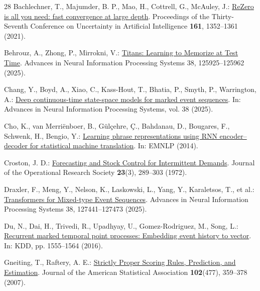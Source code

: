 \documentclass[runningheads]{llncs}
\begin{document}
\begin{thebibliography}{28}
Bachlechner, T., Majumder, B. P., Mao, H., Cottrell, G., McAuley, J.: \href{https://proceedings.mlr.press/v161/bachlechner21a.html}{ReZero is all you need: fast convergence at large depth}. Proceedings of the Thirty-Seventh Conference on Uncertainty in Artificial Intelligence \textbf{161}, 1352--1361 (2021).

Behrouz, A., Zhong, P., Mirrokni, V.: \href{https://papers.nips.cc/paper_files/paper/2025/hash/a4ca07aa108036f80cbb5b82285fd4b1-Abstract-Conference.html}{Titans: Learning to Memorize at Test Time}. Advances in Neural Information Processing Systems 38, 125925--125962 (2025). 

Chang, Y., Boyd, A., Xiao, C., Kass-Hout, T., Bhatia, P., Smyth, P., Warrington, A.:
\href{https://arxiv.org/abs/2412.19634}{Deep continuous-time state-space models for marked event sequences}. In: Advances in Neural Information Processing Systems, vol. 38 (2025).

Cho, K., van Merri\"enboer, B., G\"ul\c{c}ehre, \c{C}., Bahdanau, D., Bougares, F., Schwenk, H., Bengio, Y.:
\href{https://arxiv.org/abs/1406.1078}{Learning phrase representations using RNN encoder--decoder for statistical machine translation}. In: EMNLP (2014).

Croston, J. D.: \href{https://link.springer.com/article/10.1057/jors.1972.50}{Forecasting and Stock Control for Intermittent Demands}. Journal of the Operational Research Society \textbf{23}(3), 289--303 (1972). 

Draxler, F., Meng, Y., Nelson, K., Laskowski, L., Yang, Y., Karaletsos, T., et al.: \href{https://proceedings.nips.cc/paper_files/paper/2025/hash/a6c7515ac435277dc92b75a07bb2257c-Abstract-Conference.html}{Transformers for Mixed-type Event Sequences}. Advances in Neural Information Processing Systems 38, 127441--127473 (2025). 

Du, N., Dai, H., Trivedi, R., Upadhyay, U., Gomez-Rodriguez, M., Song, L.:
\href{https://doi.org/10.1145/2939672.2939875}{Recurrent marked temporal point processes: Embedding event history to vector}. In: KDD, pp. 1555--1564 (2016). 

Gneiting, T., Raftery, A. E.: \href{https://doi.org/10.1198/016214506000001437}{Strictly Proper Scoring Rules, Prediction, and Estimation}. Journal of the American Statistical Association \textbf{102}(477), 359--378 (2007). 


\end{thebibliography}
\end{document}
